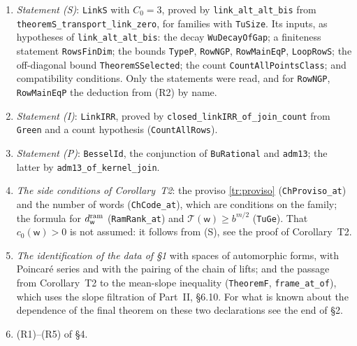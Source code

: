 \documentclass[11pt,letterpaper]{article}
\begin{document}
\begingroup\sloppy
\begin{enumerate}[label=\textup{(\roman*)},leftmargin=2.4em]
\item \emph{Statement \textup{(S)}}: \texttt{LinkS} with $C_0=3$, proved by \texttt{link\_alt\_alt\_bis} from
\texttt{theoremS\_transport\_link\_zero}, for families with \texttt{TuSize}. Its inputs, as hypotheses of
\texttt{link\_alt\_alt\_bis}: the decay \texttt{WuDecayOfGap}; a finiteness statement \texttt{RowsFinDim}; the
bounds \texttt{TypeP}, \texttt{RowNGP}, \texttt{RowMainEqP}, \texttt{LoopRowS}; the off-diagonal bound
\texttt{TheoremSSelected}; the count \texttt{CountAllPointsClass}; and compatibility conditions. Only the
statements were read, and for \texttt{RowNGP}, \texttt{RowMainEqP} the deduction from (R2) by name.
\item \emph{Statement \textup{(I)}}: \texttt{LinkIRR}, proved by \texttt{closed\_linkIRR\_of\_join\_count} from
\texttt{Green} and a count hypothesis (\texttt{CountAllRows}).
\item \emph{Statement \textup{(P)}}: \texttt{BesselId}, the conjunction of \texttt{BuRational} and
\texttt{adm13}; the latter by \texttt{adm13\_of\_kernel\_join}.
\item \emph{The side conditions of Corollary~T2}: the proviso \eqref{tr:proviso} (\texttt{ChProviso\_at}) and
the number of words (\texttt{ChCode\_at}), which are conditions on the family; the formula for
$d^{\rm ram}_{\mathsf w}$ (\texttt{RamRank\_at}) and $\mathcal T(\mathsf w)\ge b^{m/2}$ (\texttt{TuGe}). That
$c_0(\mathsf w)>0$ is not assumed: it follows from (S), see the proof of Corollary~T2.
\item \emph{The identification of the data of \S1} with spaces of automorphic forms, with Poincar\'e series
and with the pairing of the chain of lifts; and the passage from Corollary~T2 to the mean-slope inequality
(\texttt{TheoremF}, \texttt{frame\_at\_of}), which uses the slope filtration of Part~II, \S6.10. For what is
known about the dependence of the final theorem on these two declarations see the end of \S2.
\item (R1)--(R5) of \S4.
\end{enumerate}
\end{document}
